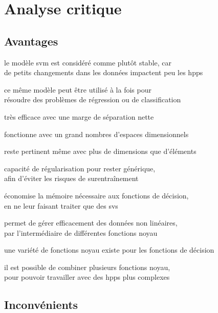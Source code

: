 \section{Analyse critique}

\subsection{Avantages}

\begin{itmz}
\item{le modèle \gls{svm} est considéré comme plutôt stable, car\\
de petits changements dans les données impactent peu les \glspl{hpp}}
\item{ce même modèle peut être utilisé à la fois pour\\
résoudre des problèmes de régression ou de classification}
\item{très efficace avec une marge de séparation nette}
\item{fonctionne avec un grand nombres d’espaces dimensionnels}
\item{reste pertinent même avec plus de dimensions que d’éléments}
\item{capacité de régularisation pour rester générique,\\
afin d’éviter les risques de surentraînement}
\item{économise la mémoire nécessaire aux fonctions de décision,\\
en ne leur faisant traiter que des \glspl{sv}}
\item{permet de gérer efficacement des données non linéaires,\\
par l’intermédiaire de différentes fonctions noyau}
\item{une variété de fonctions noyau existe pour les fonctions de décision}
\item{il est possible de combiner plusieurs fonctions noyau,\\
pour pouvoir travailler avec des \glspl{hpp} plus complexes}
\end{itmz}

\subsection{Inconvénients}

